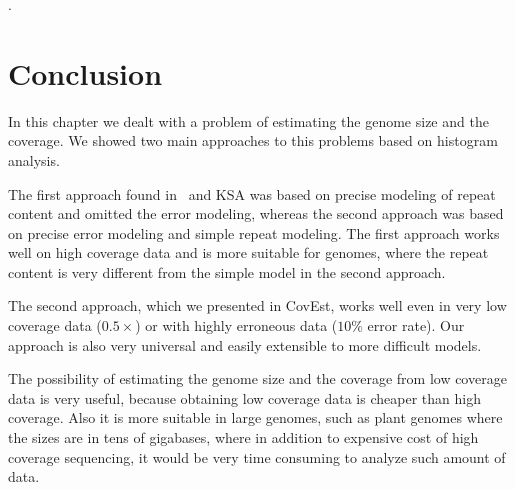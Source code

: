 .

\section{Conclusion}

In this chapter we dealt with a problem of estimating the genome size and the coverage. We showed two main approaches to this problems based on \kmer histogram analysis.

The first approach found in~\cite{waterman} and KSA\cite{williams} was based on precise modeling of repeat content and omitted the error modeling, whereas the second approach was based on precise error modeling and simple repeat modeling.
The first approach works well on high coverage data and is more suitable for genomes, where the repeat content is very different from the simple model in the second approach.

The second approach, which we presented in CovEst\cite{covest}, works well even in very low coverage data ($0.5\times$) or with highly erroneous data ($10\%$ error rate). Our approach is also very universal and easily extensible to more difficult models.

The possibility of estimating the genome size and the coverage from low coverage data is very useful, because obtaining low coverage data is  cheaper than high coverage. Also it is more suitable in large genomes, such as plant genomes where the sizes are in tens of gigabases, where in addition to expensive cost of high coverage sequencing, it would be very time consuming to analyze such amount of data.
